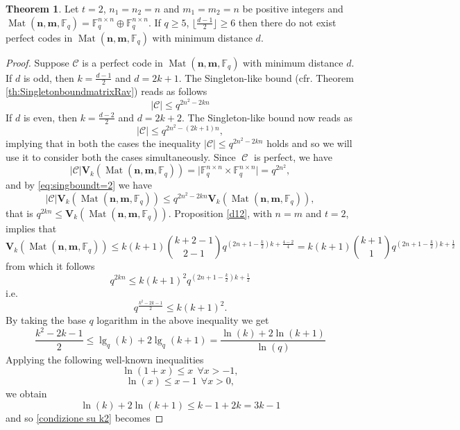 \documentclass[11pt]{amsart}
\DeclareMathOperator{\C}{\mathcal{C}}
\DeclareMathOperator{\Mat}{Mat}
\theoremstyle{definition}
\newtheorem{theorem}{Theorem}[section]
\newcommand{\F}{{\mathbb F}}
\newcommand{\bfn}{\mathbf {n}}
\newcommand{\bfm}{\mathbf {m}}
\newcommand{\spacmn}{\Mat(\bfn,\bfm,\F_q)}
\begin{document}
\begin{theorem}\label{thm:nonexistence1t=2}
Let $t=2$, $ n_1 = n_2 = n $ and $ m_1 = m_2 = n $ be positive integers and $\spacmn=\mathbb{F}_q^{n\times n}\oplus\mathbb{F}_q^{n\times n}$. If $q\geq 5$, $\lfloor \frac{d-1}2\rfloor \geq 6$ then there do not exist perfect codes in $\spacmn$ with minimum distance $d$. 
\end{theorem}
\begin{proof} 
Suppose $\mathcal{C}$ is a perfect code in $\spacmn$ with minimum distance $d$. 
If $d$ is odd, then $k=\frac{d-1}{2}$ and $d=2k+1$.
The Singleton-like bound (cfr. Theorem \ref{th:SingletonboundmatrixRav}) reads as follows 
\begin{equation}\label{eq:singboundt=2}
\lvert \mathcal{C}\rvert\leq q^{2n^2-2kn}
\end{equation}
If $d$ is even, then $k=\frac{d-2}{2}$ and $d=2k+2$. The Singleton-like bound now reads as 
\begin{equation}\label{eq:singboundt=22}
\lvert \mathcal{C}\rvert\leq q^{2n^2-(2k+1)n},
\end{equation}
implying that in both the cases the inequality  $\lvert \mathcal{C}\rvert\leq q^{2n^2-2kn}$ holds and so we will use it to consider both the cases simultaneously.
Since $\C$ is perfect, we have
	\[
\lvert \mathcal{C}\rvert \mathbf{V}_k(\spacmn) =\lvert \mathbb{F}_q^{n\times n}\times \mathbb{F}_q^{n\times n}\rvert=q^{2n^2},\]
and by \eqref{eq:singboundt=2} we have
\[\lvert \mathcal{C}\rvert \mathbf{V}_k(\spacmn) \leq q^{2n^2-2kn}\mathbf{V}_k(\spacmn),
\]
that is $q^{2kn}\leq \mathbf{V}_k(\spacmn)$.
Proposition \ref{d12}, with $n=m$ and $t=2$, implies that 
\[
\mathbf{V}_k(\spacmn)\leq k(k+1)\binom{k+2-1}{2-1}q^{(2n+1-\frac{k}{2})k+\frac{4-2}{4}}=k(k+1)\binom{k+1}{1}q^{(2n+1-\frac{k}{2})k+\frac{1}{2}}
\]
from which it follows
\[
	q^{2kn}\leq k(k+1)^2q^{(2n+1-\frac{k}{2})k+\frac{1}{2}}
\]
i.e.
\begin{equation}\label{condizione su k}
q^{\frac{k^2-2k-1}{2}}\leq k(k+1)^2.
\end{equation}
By taking the base $q$ logarithm in the above inequality we get
\begin{equation}\label{condizione su k2}
\frac{k^2-2k-1}{2}\leq \lg_q(k)+2\lg_q(k+1)=\frac{\ln(k)+2\ln(k+1)}{\ln(q)}
\end{equation}
Applying the following well-known inequalities
\[
\ln(1+x)\leq x \ \ \forall x>-1,
\]
\[
\ln(x)\leq x-1 \ \ \forall x>0,
\]
we obtain
\[
\ln(k)+2\ln(k+1)\leq k-1+2k=3k-1
\]
and so \eqref{condizione su k2} becomes

\end{proof}
\end{document}
